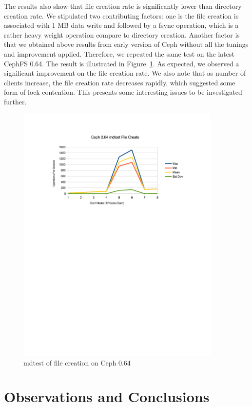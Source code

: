 \documentclass{article}
\begin{document}
The results also show that file creation rate is significantly lower than
directory creation rate. We stipulated two contributing factors: one is the file
creation is associated with 1 MB data write and followed by a fsync operation,
which is a rather heavy weight operation compare to directory creation. Another
factor is that we obtained above results from early version of Ceph without all
the tunings and improvement applied. Therefore, we repeated the same test on the
latest CephFS 0.64. The result is illustrated in
Figure~\ref{fig:mdtest-064-file-create}. As expected, we observed a significant
improvement on the file creation rate. We also note that as number of clients
increase, the file creation rate decreases rapidly, which suggested some form of
lock contention. This presents some interesting issues to be investigated
further.

\begin{figure}[htb]
\centering
\includegraphics[width=4in]{mdtest-064-file-create}
\caption{mdtest of file creation on Ceph 0.64}
\label{fig:mdtest-064-file-create}
\end{figure}

\section{Observations and Conclusions}
\end{document}
